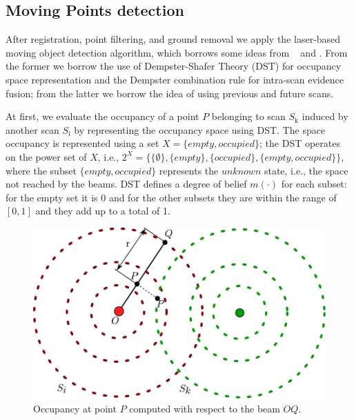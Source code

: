 \subsection{Moving Points detection}
After registration, point filtering, and ground removal we apply the laser-based moving object detection algorithm, which borrows some ideas from ~\cite{xiao2013change} and \cite{vallet2015extracting}. From the former we borrow the use of Dempster-Shafer Theory (DST) for occupancy space representation and the Dempster combination rule for intra-scan evidence fusion; from the latter we borrow the idea of using previous and future scans.

At first, we evaluate the occupancy of a point $P$ belonging to scan $S_{\text{k}}$ induced by another scan $S_{\text{i}}$ by representing the occupancy space using DST.  The space occupancy is represented using a set $X = \{empty, occupied\}$; the DST operates on the power set of $X$, i.e., $2^X = \{\{\emptyset\}, \{empty\}, \{occupied\}, \{empty,occupied\}\}$, where the subset $\{empty,occupied\}$ represents the $unknown$ state, i.e., the space not reached by the beams. DST defines a degree of belief $m(\cdot)$ for each subset: for the empty set it is 0 and for the other subsets they are within the range of $[0, 1]$ and they add up to a total of 1.

\begin{figure}[t]
\centering
\includegraphics[width=0.7\columnwidth]{./img/ch-laser/scanoccupancy}
\caption{Occupancy at point $P$ computed with respect to the beam $OQ$.}
\label{fig:scanocc}
\end{figure}

